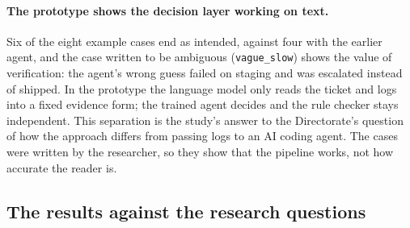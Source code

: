 \documentclass[11pt,a4paper]{article}
\begin{document}
\paragraph{The prototype shows the decision layer working on text.} Six of the eight example cases end as intended, against four with the earlier agent, and the case written to be ambiguous (\texttt{vague\_slow}) shows the value of verification: the agent's wrong guess failed on staging and was escalated instead of shipped. In the prototype the language model only reads the ticket and logs into a fixed evidence form; the trained agent decides and the rule checker stays independent. This separation is the study's answer to the Directorate's question of how the approach differs from passing logs to an AI coding agent. The cases were written by the researcher, so they show that the pipeline works, not how accurate the reader is.

\subsection{The results against the research questions}\label{sec:disc-rq}
\end{document}
